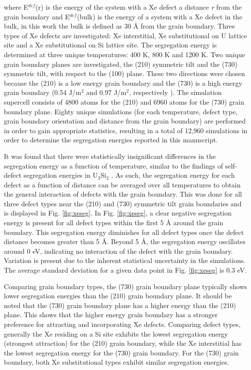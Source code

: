 \documentclass[review]{elsarticle}
\begin{document}
where E$^{def}$(r) is the energy of the system with a Xe defect a distance \textit{r} from the grain boundary and E$^{def}$(bulk) is the energy of a system with a Xe defect in the bulk, in this work the bulk is defined as 30 {\AA} from the grain boundary. Three types of Xe defects are investigated: Xe interstitial, Xe substitutional on U lattice site and a Xe substitutional on Si lattice site. The segregation energy is determined at three unique temperatures: 400 K, 800 K and 1200 K. Two unique grain boundary planes are investigated, the (210) symmetric tilt and the (730) symmetric tilt, with respect to the (100) plane. These two directions were chosen because the (210) is a low energy grain boundary and the (730) is a high energy grain boundary (0.54 J/m$^2$ and 0.97 J/m$^2$, respectively \cite{beeler_usi_gb}). The simulation supercell consists of 4800 atoms for the (210) and 6960 atoms for the (730) grain boundary plane. Eighty unique simulations (for each temperature, defect type, grain boundary orientation and distance from the grain boundary) are performed in order to gain appropriate statistics, resulting in a total of 12,960 simulations in order to determine the segregation energies reported in this manuscript.

It was found that there were statistically insignificant differences in the segregation energy as a function of temperature, similar to the findings of self-defect segregation energies in U$_3$Si$_2$ \cite{beeler_usi_gb}. As such, the segregation energy for each defect as a function of distance can be averaged over all temperatures to obtain the general interaction of defects with the grain boundary. This was done for all three defect types near the (210) and (730) symmetric tilt grain boundaries and is displayed in Fig. \ref{fig:xeseg}. In Fig. \ref{fig:xeseg}, a clear negative segregation energy is present for all defect types within the first 5 {\AA} around the grain boundary. This segregation energy diminishes for all defect types once the defect distance becomes greater than 5 {\AA}. Beyond 5 {\AA}, the segregation energy oscillates around 0 eV, indicating no interaction of the defect with the grain boundary. Variation is present due to the inherent statistical uncertainty in the simulations. The average standard deviation for a given data point in Fig. \ref{fig:xeseg} is 0.3 eV.

Comparing grain boundary types, the (730) grain boundary plane typically shows lower segregation energies than the (210) grain boundary plane. It should be noted that the (730) grain boundary plane has a higher energy than the (210) plane. This shows that the higher energy grain boundary has a stronger preference for attracting and incorporating Xe defects. Comparing defect types, generally the Xe residing on a Si site exhibits the lowest segregation energy (strongest attraction) for the (210) grain boundary, while the Xe interstitial has the lowest segregation energy for the (730) grain boundary. For the (730) grain boundary, both Xe substitutional types exhibit similar segregation energies. 
\end{document}

